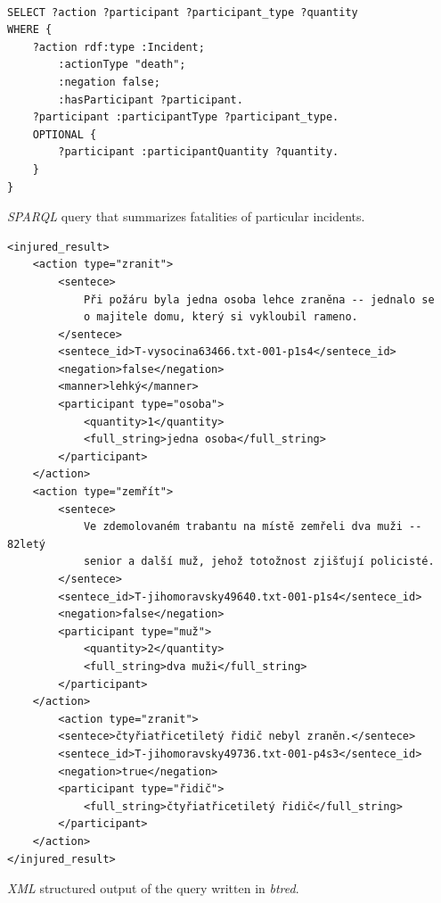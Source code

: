 \begin{listing}
\begin{verbatim}

SELECT ?action ?participant ?participant_type ?quantity
WHERE {
	?action rdf:type :Incident;
		:actionType "death";
		:negation false;
		:hasParticipant ?participant.
	?participant :participantType ?participant_type.
	OPTIONAL {
		?participant :participantQuantity ?quantity.
	}
}
\end{verbatim}
\caption{\emph{SPARQL} query that summarizes fatalities of particular incidents.}
\label{lst:sparql_aggregation}
\end{listing}



\begin{listing}
\begin{verbatim}
<injured_result>
	<action type="zranit">
		<sentece>
			Při požáru byla jedna osoba lehce zraněna -- jednalo se
			o majitele domu, který si vykloubil rameno.
		</sentece>
		<sentece_id>T-vysocina63466.txt-001-p1s4</sentece_id>
		<negation>false</negation>
		<manner>lehký</manner>
		<participant type="osoba">
			<quantity>1</quantity>
			<full_string>jedna osoba</full_string>
		</participant>
	</action>
	<action type="zemřít">
		<sentece>
			Ve zdemolovaném trabantu na místě zemřeli dva muži -- 82letý
			senior a další muž, jehož totožnost zjišťují policisté.
		</sentece>
		<sentece_id>T-jihomoravsky49640.txt-001-p1s4</sentece_id>
		<negation>false</negation>
		<participant type="muž">
			<quantity>2</quantity>
			<full_string>dva muži</full_string>
		</participant>
	</action>
		<action type="zranit">
		<sentece>čtyřiatřicetiletý řidič nebyl zraněn.</sentece>
		<sentece_id>T-jihomoravsky49736.txt-001-p4s3</sentece_id>
		<negation>true</negation>
		<participant type="řidič">
			<full_string>čtyřiatřicetiletý řidič</full_string>
		</participant>
	</action>
</injured_result>
\end{verbatim}
\caption{\emph{XML} structured output of the query written in \emph{btred}.}
\label{lst:btred_xml}
\end{listing}




